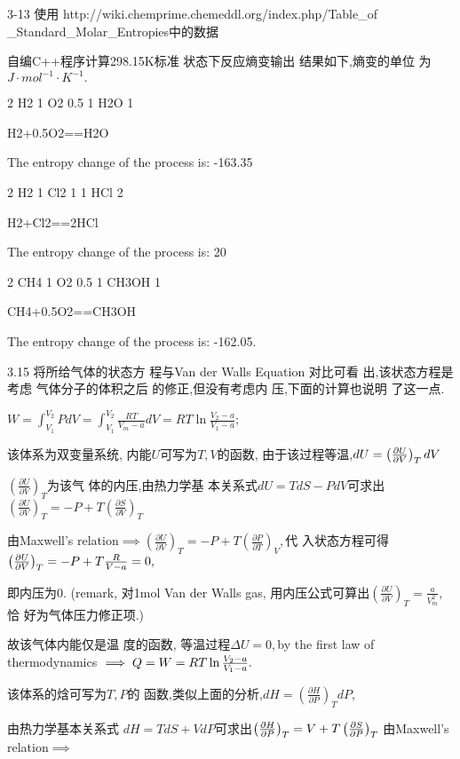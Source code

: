 \documentclass{ctexart}
\begin{document}
3-13 使用 http://wiki.chemprime.chemeddl.org/index.php/Table\_of%
\_Standard\_Molar\_Entropies中的数据

自编C++程序计算298.15K标准%
状态下反应熵变输出%
结果如下,熵变的单位%
为 $\unit{J}\cdot \unit{mol}^{-1}\cdot \unit{K}^{-1}.$

2 H2 1 O2 0.5 1 H2O 1

H2+0.5O2==H2O

The entropy change of the process is: -163.35

2 H2 1 Cl2 1 1 HCl 2

H2+Cl2==2HCl

The entropy change of the process is: 20

2 CH4 1 O2 0.5 1 CH3OH 1

CH4+0.5O2==CH3OH

The entropy change of the process is: -162.05.

3.15 将所给气体的状态方%
程与Van der Walls Equation 对比可看%
出,该状态方程是考虑%
气体分子的体积之后%
的修正,但没有考虑内%
压,下面的计算也说明%
了这一点.

$W=\int_{V_{1}}^{V_{2}}PdV=\int_{V_{1}}^{V_{2}}\frac{RT}{V_{m}-a}dV=RT\ln 
\frac{V_{2}-a}{V_{1}-a};$

该体系为双变量系统,%
内能$U$可写为$T,V$的函数,%
由于该过程等温,$dU=\left( \frac{%
\partial U}{\partial V}\right) _{T}dV$

$\left( \frac{\partial U}{\partial V}\right) _{T}$为该气%
体的内压,由热力学基%
本关系式\qquad $dU=TdS-PdV$可求出$%
\left( \frac{\partial U}{\partial V}\right) _{T}=-P+T\left( \frac{\partial S%
}{\partial V}\right) _{T}$

由Maxwell's relation$\implies \left( \frac{\partial U}{\partial V}%
\right) _{T}=-P+T\left( \frac{\partial P}{\partial T}\right) _{V},$代%
入状态方程可得$\left( \frac{%
\partial U}{\partial V}\right) _{T}=-P+T\frac{R}{V-a}=0,$

即内压为0. (remark, 对1mol Van der Walls gas,%
用内压公式可算出$\left( 
\frac{\partial U}{\partial V}\right) _{T}=\frac{a}{V_{m}^{2}},$恰%
好为气体压力修正项.)

故该气体内能仅是温%
度的函数, 等温过程$\Delta
U=0,$by the first law of thermodynamics $\implies Q=W=RT\ln \frac{V_{2}-a}{%
V_{1}-a}.$

该体系的焓可写为$T,P$的%
函数,类似上面的分析,$%
dH=\left( \frac{\partial H}{\partial P}\right) _{T}dP,$

由热力学基本关系式%
\qquad $dH=TdS+VdP$可求出$\left( \frac{\partial H}{%
\partial P}\right) _{T}=V+T\left( \frac{\partial S}{\partial P}\right) _{T}$%
由Maxwell's relation$\implies $
\end{document}
